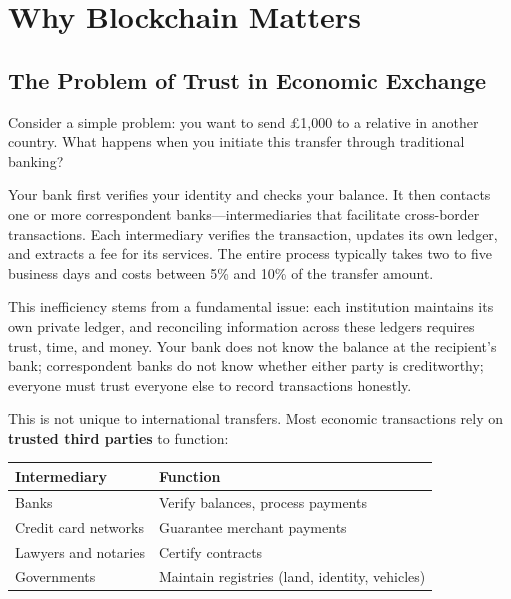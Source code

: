 \documentclass[11pt,a4paper]{article}
\newcommand{\keyword}[1]{\textbf{\textcolor{AccentOrange}{#1}}}
\begin{document}
\section{Why Blockchain Matters}

\subsection{The Problem of Trust in Economic Exchange}

Consider a simple problem: you want to send £1,000 to a relative in another country. What happens when you initiate this transfer through traditional banking?

Your bank first verifies your identity and checks your balance. It then contacts one or more correspondent banks---intermediaries that facilitate cross-border transactions. Each intermediary verifies the transaction, updates its own ledger, and extracts a fee for its services. The entire process typically takes two to five business days and costs between 5\% and 10\% of the transfer amount.

This inefficiency stems from a fundamental issue: each institution maintains its own private ledger, and reconciling information across these ledgers requires trust, time, and money. Your bank does not know the balance at the recipient's bank; correspondent banks do not know whether either party is creditworthy; everyone must trust everyone else to record transactions honestly.

This is not unique to international transfers. Most economic transactions rely on \keyword{trusted third parties} to function:

\begin{center}
\begin{tabular}{ll}
\toprule
\textbf{Intermediary} & \textbf{Function} \\
\midrule
Banks & Verify balances, process payments \\
Credit card networks & Guarantee merchant payments \\
Lawyers and notaries & Certify contracts \\
Governments & Maintain registries (land, identity, vehicles) \\
\bottomrule
\end{tabular}
\end{center}
\end{document}
